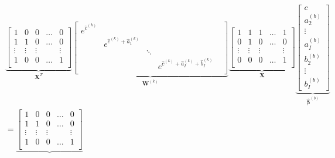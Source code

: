 \documentclass[a4paper]{book}
\begin{document}
\begin{figure}
  \centering
  \large
  \begin{displaymath}
    \begin{split}
      &\underbrace{
      \begin{bmatrix}
        1 & 0 & 0 & \dots & 0 \\
        1 & 1 & 0 & \dots & 0 \\
        \vdots & \vdots & \vdots &  & \vdots \\
        1 & 0 & 0 & \dots & 1 \\
      \end{bmatrix}
      }_{\mathbf{X}^T}
      \underbrace{
        \begin{bmatrix}
        e^{\widehat{c}^{(k)}} & & & \\
        & e^{\widehat{c}^{(k)} + \widehat{a}^{(k)}_1} & & & \\
        & & \ddots & \\
        & & & e^{\widehat{c}^{(k)} + \widehat{a}^{(k)}_I + \widehat{b}^{(k)}_I} \\
      \end{bmatrix}
      }_{\mathbf{W}^{(k)}}
      \underbrace{
      \begin{bmatrix}
        1 & 1 & 1 & \dots & 1 \\
        0 & 1 & 0 & \dots & 0 \\
        \vdots & \vdots & \vdots &  & \vdots \\
        0 & 0 & 0 & \dots & 1 \\
      \end{bmatrix}
      }_{\mathbf{X}}
      \underbrace{
      \begin{bmatrix} 
        c \\ a^{(b)}_2 \\ \vdots \\ a^{(b)}_I \\ b^{(b)}_2 \\ \vdots \\ b^{(b)}_I 
      \end{bmatrix}
      }_{\bm{\widehat{\beta}}^{(b)}} \\
      &=%
      \underbrace{
        \begin{bmatrix}
          1 & 0 & 0 & \dots & 0 \\
          1 & 1 & 0 & \dots & 0 \\
          \vdots & \vdots & \vdots &  & \vdots \\
          1 & 0 & 0 & \dots & 1 \\

\end{bmatrix}}
\end{split}
\end{displaymath}
\end{figure}
\end{document}
